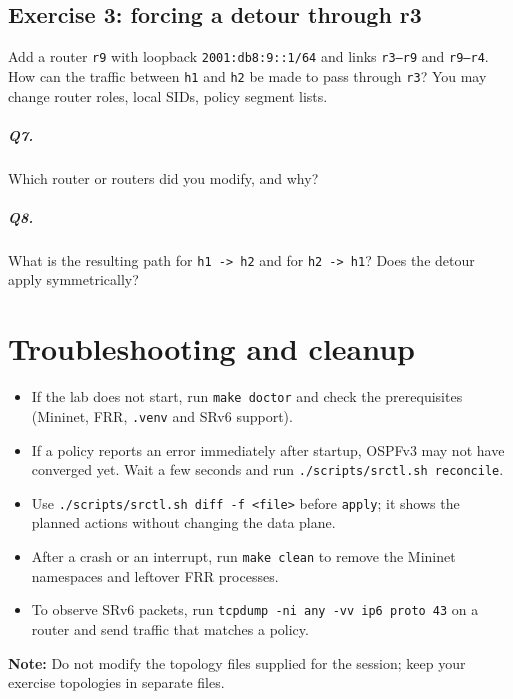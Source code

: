 \documentclass[11pt,letterpaper]{report}
\newcommand{\note}[1]{\par\medskip\noindent\textbf{Note:} #1\par}
\newcommand{\code}[1]{\texttt{#1}}
\begin{document}
\section{Exercise 3: forcing a detour through r3}

Add a router \code{r9} with loopback \code{2001:db8:9::1/64} and links
\code{r3--r9} and \code{r9--r4}. \\

\noindent How can the traffic between \code{h1} and \code{h2} be made to pass through
\code{r3}? You may change router roles, local SIDs, policy segment lists.


\paragraph{Q7.} Which router or routers did you modify, and why?

\paragraph{Q8.} What is the resulting path for \code{h1 -> h2} and for
\code{h2 -> h1}?  Does the detour apply symmetrically?

\clearpage

\appendix
\chapter{Troubleshooting and cleanup}

\begin{itemize}
  \item If the lab does not start, run \code{make doctor} and check the
        prerequisites (Mininet, FRR, \code{.venv} and SRv6 support).
  \item If a policy reports an error immediately after startup, OSPFv3 may not
        have converged yet.  Wait a few seconds and run
        \code{./scripts/srctl.sh reconcile}.
  \item Use \code{./scripts/srctl.sh diff -f <file>} before
        \code{apply}; it shows the planned actions without changing the data
        plane.
  \item After a crash or an interrupt, run \code{make clean} to remove the
        Mininet namespaces and leftover FRR processes.
  \item To observe SRv6 packets, run
        \code{tcpdump -ni any -vv ip6 proto 43} on a router and send traffic
        that matches a policy.
\end{itemize}

\note{Do not modify the topology files supplied for the session; keep your
exercise topologies in separate files.}
\end{document}
